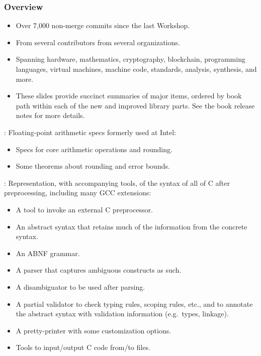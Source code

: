 \begin{frame}

\frametitle{Overview}

\begin{itemize}
\item Over 7,000 non-merge commits since the last Workshop.
\item From several contributors from several organizations.
\item Spanning hardware, mathematics, cryptography, blockchain,
      programming languages, virtual machines, machine code,
      standards, analysis, synthesis, and more.
\item These slides provide succinct summaries of major items,
      ordered by book path within each of the new and improved library parts.
      See the book release notes for more details.
\end{itemize}

\end{frame}


\begin{frame}

\newlibtitle

:
Floating-point arithmetic specs formerly used at Intel:
\begin{itemize}
\item Specs for core arithmetic operations and rounding.
\item Some theorems about rounding and error bounds.
\end{itemize}

\end{frame}


\begin{frame}

\newlibtitle

:
Representation, with accompanying tools,
of the syntax of all of C after preprocessing,
including many GCC extensions:
\begin{itemize}
\item A tool to invoke an external C preprocessor.
\item An abstract syntax that retains
      much of the information from the concrete syntax.
\item An ABNF grammar.
\item A parser that captures ambiguous constructs as such.
\item A disambiguator to be used after parsing.
\item A partial validator to check typing rules, scoping rules, etc.,
      and to annotate the abstract syntax with validation information
      (e.g.\ types, linkage).
\item A pretty-printer with some customization options.
\item Tools to input/output C code from/to files.
\end{itemize}

\end{frame}

